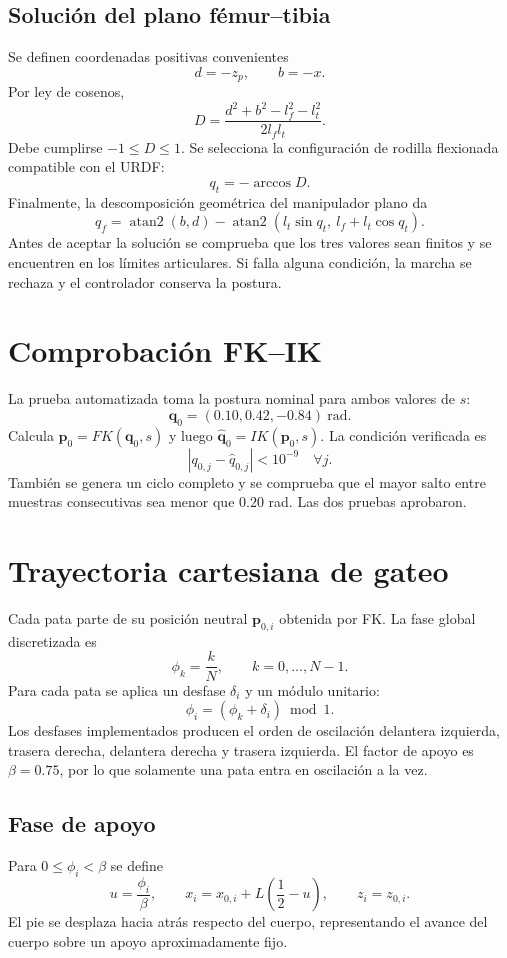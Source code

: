 \documentclass[11pt,a4paper]{article}
\newcommand{\vect}[1]{\boldsymbol{#1}}
\newcommand{\atan}{\operatorname{atan2}}
\begin{document}
\subsection{Solución del plano fémur--tibia}
Se definen coordenadas positivas convenientes
\[
d=-z_p,\qquad b=-x.
\]
Por ley de cosenos,
\[
D=\frac{d^2+b^2-l_f^2-l_t^2}{2l_fl_t}.
\]
Debe cumplirse $-1\le D\le1$. Se selecciona la configuración de rodilla
flexionada compatible con el URDF:
\[
\boxed{q_t=-\arccos D}.
\]
Finalmente, la descomposición geométrica del manipulador plano da
\[
\boxed{
q_f=\atan(b,d)-
\atan\!\left(l_t\sin q_t,\ l_f+l_t\cos q_t\right)}.
\]
Antes de aceptar la solución se comprueba que los tres valores sean finitos y
se encuentren en los límites articulares. Si falla alguna condición, la marcha
se rechaza y el controlador conserva la postura.

\section{Comprobación FK--IK}
La prueba automatizada toma la postura nominal para ambos valores de $s$:
\[
\vect q_0=(0.10,0.42,-0.84)\ \text{rad}.
\]
Calcula $\vect p_0=FK(\vect q_0,s)$ y luego
$\widehat{\vect q}_0=IK(\vect p_0,s)$. La condición verificada es
\[
|q_{0,j}-\widehat q_{0,j}|<10^{-9}\quad\forall j.
\]
También se genera un ciclo completo y se comprueba que el mayor salto entre
muestras consecutivas sea menor que $0.20$ rad. Las dos pruebas aprobaron.

\section{Trayectoria cartesiana de gateo}
Cada pata parte de su posición neutral $\vect p_{0,i}$ obtenida por FK. La fase
global discretizada es
\[
\phi_k=\frac{k}{N},\qquad k=0,\ldots,N-1.
\]
Para cada pata se aplica un desfase $\delta_i$ y un módulo unitario:
\[
\phi_i=(\phi_k+\delta_i)\bmod 1.
\]
Los desfases implementados producen el orden de oscilación
delantera izquierda, trasera derecha, delantera derecha y trasera izquierda.
El factor de apoyo es $\beta=0.75$, por lo que solamente una pata entra en
oscilación a la vez.

\subsection{Fase de apoyo}
Para $0\le\phi_i<\beta$ se define
\[
u=\frac{\phi_i}{\beta},\qquad
x_i=x_{0,i}+L\left(\frac12-u\right),\qquad z_i=z_{0,i}.
\]
El pie se desplaza hacia atrás respecto del cuerpo, representando el avance del
cuerpo sobre un apoyo aproximadamente fijo.
\end{document}
